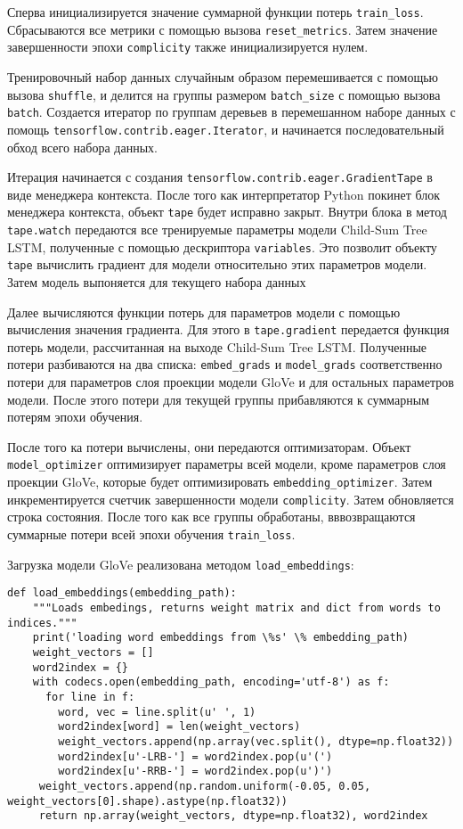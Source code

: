 Сперва инициализируется значение суммарной функции потерь \texttt{tra\-in\_loss}. Сбрасываются все метрики с помощью вызова \texttt{reset\_metrics}. Затем значение завершенности эпохи \texttt{complicity} также инициализируется нулем.

Тренировочный набор данных случайным образом перемешивается с помощью вызова \texttt{shuffle}, и делится на группы размером \texttt{batch\_size} с помощью вызова \texttt{batch}. Создается итератор по группам деревьев в перемешанном наборе данных с помощь \texttt{tensorflow.contrib.eager.Iterator}, и начинается последовательный обход всего набора данных.

Итерация начинается с создания \texttt{tensorflow.contrib.eager.Gradi\-entTape} в виде менеджера контекста. После того как интерпретатор Python покинет блок менеджера контекста, объект \texttt{tape} будет исправно закрыт. Внутри блока в метод \texttt{tape.watch} передаются все тренируемые параметры модели Child-Sum Tree LSTM\@, полученные с помощью дескриптора \texttt{variables}. Это позволит объекту \texttt{tape} вычислить градиент для модели относительно этих параметров модели. Затем модель выпоняется для текущего набора данных

Далее вычисляются функции потерь для параметров модели с помощью вычисления значения градиента. Для этого в \texttt{tape.gradient} передается функция потерь модели, рассчитанная на выходе Child-Sum Tree LSTM\@. Полученные потери разбиваются на два списка: \texttt{embed\_grads} и \texttt{model\_grads} соответственно потери для параметров слоя проекции модели GloVe и для остальных параметров модели. После этого потери для текущей группы прибавляются к суммарным потерям эпохи обучения.

После того ка потери вычислены, они передаются оптимизаторам. Объект \texttt{model\_optimizer} оптимизирует параметры всей модели, кроме параметров слоя проекции GloVe, которые будет оптимизировать \texttt{embedding\_optimi\-zer}. Затем инкрементируется счетчик завершенности модели \texttt{complicity}. Затем обновляется строка состояния. После того как все группы обработаны, вввозвращаются суммарные потери всей эпохи обучения \texttt{train\_loss}.

Загрузка модели GloVe реализована методом \texttt{load\_embeddings}:
\medskip
\begin{lstlisting}[style=Python]
  def load_embeddings(embedding_path):
    """Loads embedings, returns weight matrix and dict from words to indices."""
    print('loading word embeddings from \%s' \% embedding_path)
    weight_vectors = []
    word2index = {}
    with codecs.open(embedding_path, encoding='utf-8') as f:
      for line in f:
        word, vec = line.split(u' ', 1)
        word2index[word] = len(weight_vectors)
        weight_vectors.append(np.array(vec.split(), dtype=np.float32))
        word2index[u'-LRB-'] = word2index.pop(u'(')
        word2index[u'-RRB-'] = word2index.pop(u')')
     weight_vectors.append(np.random.uniform(-0.05, 0.05, weight_vectors[0].shape).astype(np.float32))
     return np.array(weight_vectors, dtype=np.float32), word2index
\end{lstlisting}
\medskip

